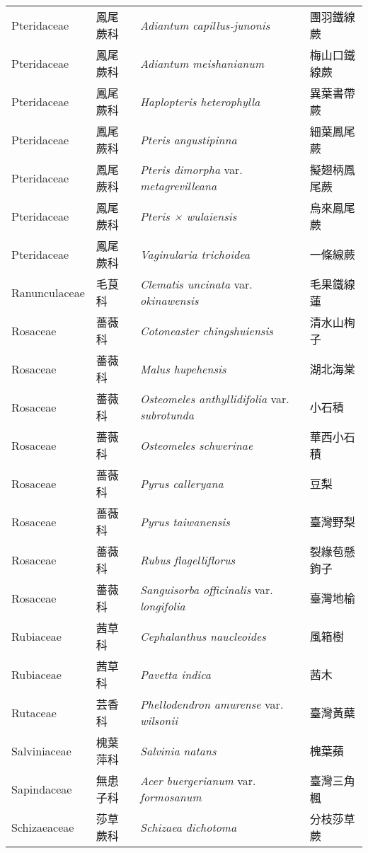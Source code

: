 \begin{longtable}{p{3cm}p{2cm}p{5cm}p{3cm}}
    Pteridaceae & 鳳尾蕨科 & \textit{Adiantum capillus-junonis}  & 團羽鐵線蕨\\
    Pteridaceae & 鳳尾蕨科 & \textit{Adiantum meishanianum}  & 梅山口鐵線蕨\\
    Pteridaceae & 鳳尾蕨科 & \textit{Haplopteris heterophylla}  & 異葉書帶蕨\\
    Pteridaceae & 鳳尾蕨科 & \textit{Pteris angustipinna}  & 細葉鳳尾蕨\\
    Pteridaceae & 鳳尾蕨科 & \textit{Pteris dimorpha} var. \textit{metagrevilleana}  & 擬翅柄鳳尾蕨\\
    Pteridaceae & 鳳尾蕨科 & \textit{Pteris × wulaiensis}   & 烏來鳳尾蕨\\
    Pteridaceae & 鳳尾蕨科 & \textit{Vaginularia trichoidea}  & 一條線蕨\\
    Ranunculaceae & 毛茛科 & \textit{Clematis uncinata} var. \textit{okinawensis}  & 毛果鐵線蓮\\
    Rosaceae & 薔薇科 & \textit{Cotoneaster chingshuiensis}  & 清水山栒子\\
    Rosaceae & 薔薇科 & \textit{Malus hupehensis}  & 湖北海棠\\
    Rosaceae & 薔薇科 & \textit{Osteomeles anthyllidifolia} var. \textit{subrotunda}  & 小石積\\
    Rosaceae & 薔薇科 & \textit{Osteomeles schwerinae}  & 華西小石積\\
    Rosaceae & 薔薇科 & \textit{Pyrus calleryana}  & 豆梨\\
    Rosaceae & 薔薇科 & \textit{Pyrus taiwanensis}  & 臺灣野梨\\
    Rosaceae & 薔薇科 & \textit{Rubus flagelliflorus}  & 裂緣苞懸鉤子\\
    Rosaceae & 薔薇科 & \textit{Sanguisorba officinalis} var. \textit{longifolia}  & 臺灣地榆\\
    Rubiaceae & 茜草科 & \textit{Cephalanthus naucleoides}  & 風箱樹\\
    Rubiaceae & 茜草科 & \textit{Pavetta indica}  & 茜木\\
    Rutaceae & 芸香科 & \textit{Phellodendron amurense} var. \textit{wilsonii}  & 臺灣黃蘗\\
    Salviniaceae & 槐葉萍科 & \textit{Salvinia natans}  & 槐葉蘋\\
    Sapindaceae & 無患子科 & \textit{Acer buergerianum} var. \textit{formosanum}  & 臺灣三角楓\\
    Schizaeaceae & 莎草蕨科 & \textit{Schizaea dichotoma}  & 分枝莎草蕨\\

\end{longtable}
